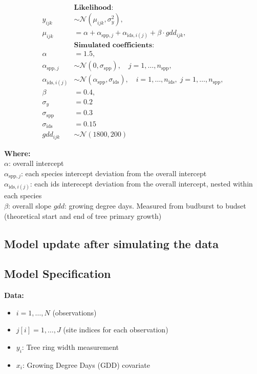 \documentclass[a4paper,12pt]{article}
\begin{document}
\[
\begin{aligned}
&\textbf{Likelihood:} \\
y_{ijk} &\sim \mathcal{N}(\mu_{ijk}, \sigma_y^2), \\
\mu_{ijk} &= \alpha + \alpha_{\text{spp}, j} + \alpha_{\text{ids}, i(j)} + \beta \cdot gdd_{ijk}, \\[1em]
&\textbf{Simulated coefficients:} \\
\alpha & = 1.5, \\
\alpha_{\text{spp}, j} &\sim \mathcal{N}(0, \sigma_{\text{spp}}), \quad j = 1, \dots, n_{\text{spp}}, \\
\alpha_{\text{ids}, i(j)} &\sim \mathcal{N}(\alpha_{\text{spp}}, \sigma_{\text{ids}}), \quad i = 1, \dots, n_{\text{ids}}, \; j=1,\dots,n_{\text{spp}}, \\
\beta & = 0.4, \\
\sigma_{y} &= 0.2 \\
\sigma_{\text{spp}} & = 0.3\\
\sigma_{\text{ids}} & = 0.15 \\
gdd_{ijk} & \sim \mathcal{N}(1800, 200) 
\end{aligned}
\]


\textbf{Where:} \\ 
$\alpha$: overall intercept \\ 
$\alpha_{\text{spp}, j}$: each species intercept deviation from the overall intercept\\ 
$\alpha_{\text{ids}, i(j)}$: each ids interecept deviation from the overall intercept, nested within each species\\
$\beta$: overall slope
$gdd$: growing degree days. Measured from budburst to budset (theoretical start and end of tree primary growth)


\subsection*{Model update after simulating the data}

\subsection*{Model Specification}

\textbf{Data:}
\begin{itemize}
    \item $i = 1, \dots, N$ (observations)
    \item $j[i] = 1, \dots, J$ (site indices for each observation)
    \item $y_i$: Tree ring width measurement
    \item $x_i$: Growing Degree Days (GDD) covariate
\end{itemize}
\end{document}
